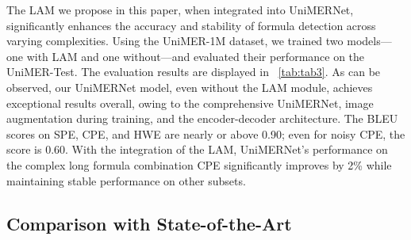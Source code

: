\documentclass[runningheads]{llncs}
\begin{document}
The LAM we propose in this paper, when integrated into UniMERNet, significantly enhances the accuracy and stability of formula detection across varying complexities. Using the UniMER-1M dataset, we trained two models—one with LAM and one without—and evaluated their performance on the UniMER-Test. The evaluation results are displayed in ~\cref{tab:tab3}. As can be observed, our UniMERNet model, even without the LAM module, achieves exceptional results overall, owing to the comprehensive UniMERNet, image augmentation during training, and the encoder-decoder architecture. The BLEU scores on SPE, CPE, and HWE are nearly or above 0.90; even for noisy CPE, the score is 0.60. With the integration of the LAM, UniMERNet's performance on the complex long formula combination CPE significantly improves by 2\% while maintaining stable performance on other subsets.


\vspace{-10pt}
\subsection{Comparison with State-of-the-Art}


\begin{table}[t]
\footnotesize
\centering
{}
\vspace{-5pt}
\end{table}
\end{document}
